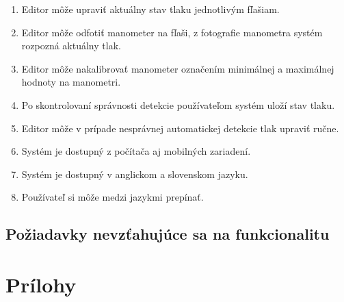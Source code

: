\documentclass[hreffootnote]{zah}
\begin{document}
\begin{enumerate}
\item Editor môže upraviť aktuálny stav tlaku jednotlivým fľašiam.
\item Editor môže odfotiť manometer na fľaši, z fotografie manometra systém rozpozná aktuálny tlak.
\item Editor môže nakalibrovať manometer označením minimálnej a maximálnej hodnoty na manometri.
\item Po skontrolovaní správnosti detekcie používateľom systém uloží stav tlaku.
\item Editor môže v prípade nesprávnej automatickej detekcie tlak upraviť ručne.
\item Systém je dostupný z počítača aj mobilných zariadení.
\item Systém je dostupný v anglickom a slovenskom jazyku.
\item Používateľ si môže medzi jazykmi prepínať.
\end{enumerate}
\subsection{Požiadavky nevzťahujúce sa na funkcionalitu}

\label{reqs}

\cleardoublepage
\section{Prílohy}
\end{document}
